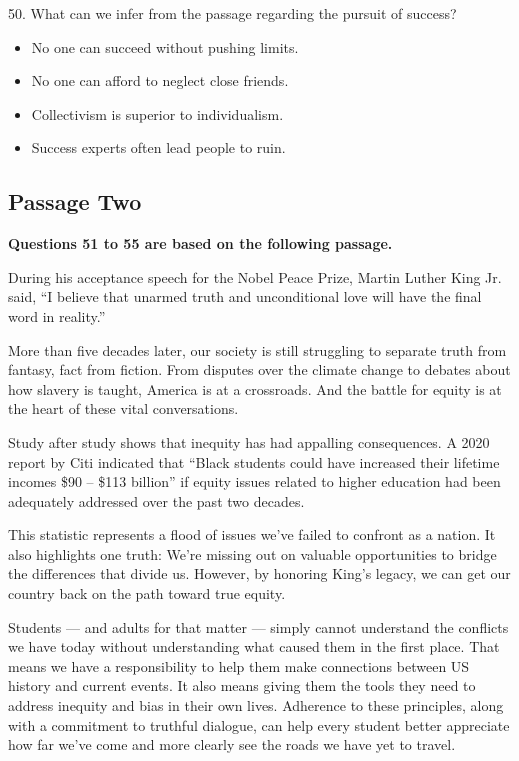 \documentclass[UTF8,11pt]{ctexart}
\begin{document}
50. What can we infer from the passage regarding the pursuit of success?


\begin{itemize}[leftmargin=2em,itemsep=.2em,topsep=.4em]\item[A.] No one can succeed without pushing limits.
\item[B.] No one can afford to neglect close friends.
\item[C.] Collectivism is superior to individualism.
\item[D.] Success experts often lead people to ruin.
\end{itemize}

\subsection*{\textbf{Passage Two}}


\textbf{Questions 51 to 55 are based on the following passage.}


During his acceptance speech for the Nobel Peace Prize, Martin Luther King Jr. said, “I believe that unarmed truth and unconditional love will have the final word in reality.”


More than five decades later, our society is still struggling to separate truth from fantasy, fact from fiction. From disputes over the climate change to debates about how slavery is taught, America is at a crossroads. And the battle for equity is at the heart of these vital conversations.


Study after study shows that inequity has had appalling consequences. A 2020 report by Citi indicated that “Black students could have increased their lifetime incomes \$90 – \$113 billion” if equity issues related to higher education had been adequately addressed over the past two decades.


This statistic represents a flood of issues we’ve failed to confront as a nation. It also highlights one truth: We’re missing out on valuable opportunities to bridge the differences that divide us. However, by honoring King’s legacy, we can get our country back on the path toward true equity.


Students — and adults for that matter — simply cannot understand the conflicts we have today without understanding what caused them in the first place. That means we have a responsibility to help them make connections between US history and current events. It also means giving them the tools they need to address inequity and bias in their own lives. Adherence to these principles, along with a commitment to truthful dialogue, can help every student better appreciate how far we’ve come and more clearly see the roads we have yet to travel.
\end{document}
